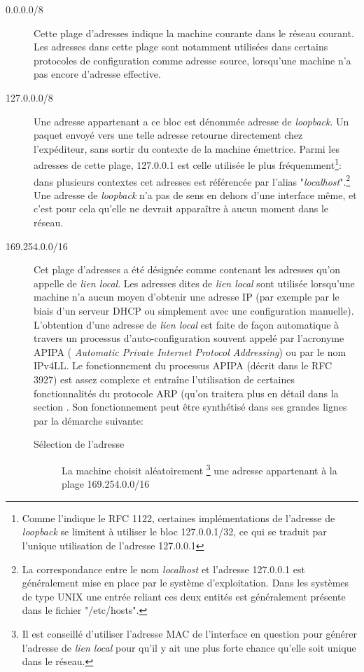 
\begin{description}
\item[0.0.0.0/8]
Cette plage d'adresses indique la machine courante dans le réseau courant.
Les adresses dans cette plage sont notamment utilisées dans certains protocoles de
configuration comme adresse source, lorsqu'une machine n'a pas encore d'adresse effective.

\item[127.0.0.0/8]
Une adresse appartenant a ce bloc est dénommée adresse de {\it loopback}.  Un
paquet envoyé vers une telle adresse retourne directement chez l'expéditeur, sans sortir
du contexte de la machine émettrice. Parmi les adresses de cette plage,
127.0.0.1 est celle utilisée le plus fréquemment\footnote{Comme l'indique
le RFC 1122, certaines implémentations de l'adresse de {\it loopback} se
limitent à utiliser le bloc 127.0.0.1/32, ce qui se traduit par l'unique utilisation de
l'adresse 127.0.0.1 }: dans plusieurs contextes cet adresses est référencée par
l'alias "{\it localhost}".\footnote{La correspondance entre le nom {\it localhost} et
l'adresse 127.0.0.1 est généralement mise en place par le système d'exploitation.
Dans les systèmes de type UNIX une entrée reliant ces deux entités est généralement
présente dans le fichier "/etc/hosts".}
Une adresse de {\it loopback} n'a pas de sens en dehors
d'une interface même, et c'est pour cela qu'elle ne devrait apparaître à aucun moment dans le réseau.


\item[169.254.0.0/16]
Cet plage d'adresses a été désignée comme contenant les adresses qu'on appelle
de {\it lien local}.  Les adresses dites de {\it lien local} sont utilisée lorsqu'une 
machine n'a aucun moyen d'obtenir une adresse IP (par exemple par le biais
d'un serveur DHCP ou simplement avec une configuration manuelle).  L'obtention
d'une adresse de {\it lien local} est faite de façon automatique à travers un
processus d'auto-configuration souvent appelé par l'acronyme APIPA ({\it
Automatic Private Internet Protocol Addressing}) ou par le nom IPv4LL.  Le
fonctionnement du processus APIPA (décrit dans le RFC 3927) est assez complexe
 et entraîne l'utilisation de certaines fonctionnalités du
protocole ARP (qu'on traitera plus en détail dans la section %
. Son fonctionnement peut être synthétisé dans ses grandes lignes par la démarche suivante:

\begin{description}
\item[Sélection de l'adresse]
La machine choisit aléatoirement
    \footnote{Il est conseillé d'utiliser l'adresse MAC de l'interface en question
    pour générer l'adresse de {\it lien local} pour qu'il y ait une plus forte chance
    qu'elle soit unique dans le réseau.} 
une adresse appartenant à la plage 169.254.0.0/16


\end{description}
\end{description}
